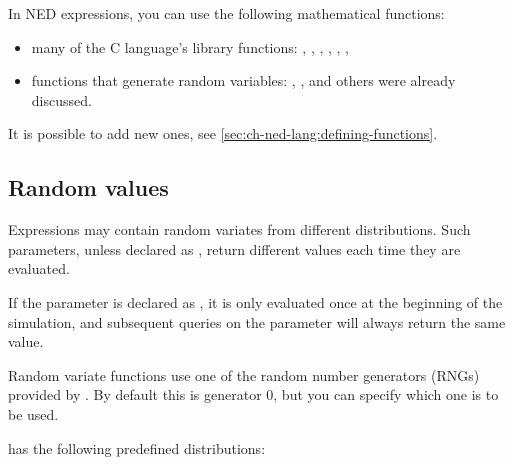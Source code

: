 In NED expressions, you can use the following mathematical functions:
\begin{itemize}
  \item{many of the C language's  library functions:
    , , , , ,
    , }
  \item{functions that generate random variables: ,
    ,  and others were already
    discussed.}
\end{itemize}

It is possible to add new ones, see \ref{sec:ch-ned-lang:defining-functions}.

\subsection{Random values}

Expressions may contain random variates from different distributions.
Such parameters, unless declared as ,
return different values each time they are evaluated.

If the parameter is declared as , it is only evaluated
once at the beginning of the simulation, and subsequent queries
on the parameter will always return the same value.

Random variate functions use one of the random number generators (RNGs)
provided by \opp. By default this is generator 0, but you can specify
which one is to be used.

{\opp} has the following predefined distributions:


